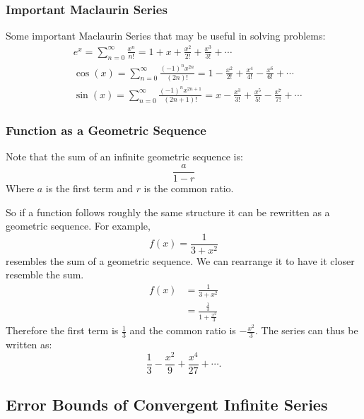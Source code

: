 \documentclass[12pt]{article}
\begin{document}
\subsubsection{Important Maclaurin Series}
\noindent Some important Maclaurin Series that may be useful in solving problems:
\begin{align*}
     & e^x = \sum_{n=0}^\infty \frac{x^n}{n!} = 1 + x + \frac{x^2}{2!} + \frac{x^3}{3!} + \cdots                                   \\[6pt]
     & \cos(x) = \sum_{n=0}^\infty \frac{(-1)^n x^{2n}}{(2n)!} = 1 - \frac{x^2}{2!} + \frac{x^4}{4!} - \frac{x^6}{6!} + \cdots     \\[6pt]
     & \sin(x) = \sum_{n=0}^\infty \frac{(-1)^n x^{2n+1}}{(2n+1)!} = x - \frac{x^3}{3!} + \frac{x^5}{5!} - \frac{x^7}{7!} + \cdots
\end{align*}

\subsubsection{Function as a Geometric Sequence}
\noindent Note that the sum of an infinite geometric sequence is:
\[ \frac{a}{1-r} \]
Where $a$ is the first term and $r$ is the common ratio.

\noindent So if a function follows roughly the same structure it can be rewritten as a geometric sequence. For example,
\[ f(x) = \frac{1}{3+x^2} \]
resembles the sum of a geometric sequence. We can rearrange it to have it closer resemble the sum.
\begin{align*}
    f(x) & = \frac{1}{3+x^2}                       \\[6pt]
         & = \frac{\frac{1}{3}}{1 + \frac{x^2}{3}}
\end{align*}
Therefore the first term is $\frac{1}{3}$ and the common ratio is $-\frac{x^2}{3}$. The series can thus be written as:
\[ \frac{1}{3} - \frac{x^2}{9} + \frac{x^4}{27} + \cdots. \]

\subsection{Error Bounds of Convergent Infinite Series}
\end{document}
